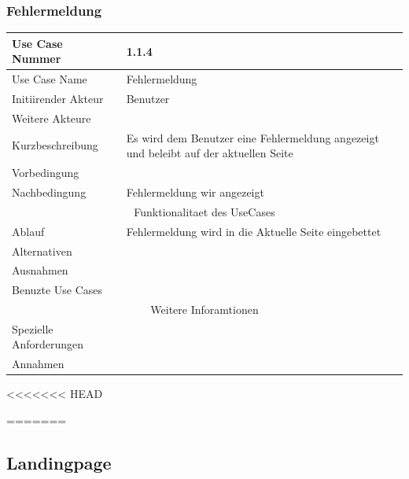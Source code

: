 \documentclass[10pt,a4paper]{article}
\begin{document}
	\subsubsection{Fehlermeldung}
		\begin{tabular}{|l|p{.5\linewidth}|}
		\hline Use Case Nummer & 1.1.4 \\ 
		\hline Use Case Name & Fehlermeldung \\ 
		\hline Initiirender Akteur & Benutzer \\
		\hline Weitere Akteure &  \\
		\hline Kurzbeschreibung & Es wird dem Benutzer eine Fehlermeldung angezeigt und beleibt auf der aktuellen Seite \\
		\hline Vorbedingung &  \\
		\hline Nachbedingung & Fehlermeldung wir angezeigt \\
		\hline \multicolumn{2}{|c|}{Funktionalitaet des UseCases}\\
		\hline Ablauf & Fehlermeldung wird in die Aktuelle Seite eingebettet \\
		\hline Alternativen &  \\
		\hline Ausnahmen &  \\
		\hline Benuzte Use Cases &  \\
		\hline \multicolumn{2}{|c|}{Weitere Inforamtionen} \\
		\hline Spezielle Anforderungen &  \\
		\hline Annahmen &  \\
		\hline
		\end{tabular} 
<<<<<<< HEAD
	 

=======
\subsection{Landingpage}
\end{document}
